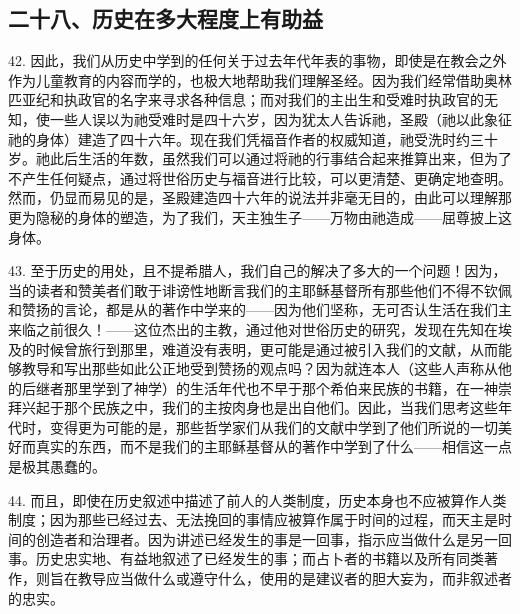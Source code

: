 
\subsection{二十八、历史在多大程度上有助益}

42. 因此，我们从历史中学到的任何关于过去年代年表的事物，即使是在教会之外作为儿童教育的内容而学的，也极大地帮助我们理解圣经。因为我们经常借助奥林匹亚纪和执政官的名字来寻求各种信息；而对我们的主出生和受难时执政官的无知，使一些人误以为祂受难时是四十六岁，因为犹太人告诉祂，圣殿（祂以此象征祂的身体）建造了四十六年。现在我们凭福音作者的权威知道，祂受洗时约三十岁。祂此后生活的年数，虽然我们可以通过将祂的行事结合起来推算出来，但为了不产生任何疑点，通过将世俗历史与福音进行比较，可以更清楚、更确定地查明。然而，仍显而易见的是，圣殿建造四十六年的说法并非毫无目的，由此可以理解那更为隐秘的身体的塑造，为了我们，天主独生子——万物由祂造成——屈尊披上这身体。\par

43. 至于历史的用处，且不提希腊人，我们自己的解决了多大的一个问题！因为，当的读者和赞美者们敢于诽谤性地断言我们的主耶稣基督所有那些他们不得不钦佩和赞扬的言论，都是从的著作中学来的——因为他们坚称，无可否认生活在我们主来临之前很久！——这位杰出的主教，通过他对世俗历史的研究，发现在先知在埃及的时候曾旅行到那里，难道没有表明，更可能是通过被引入我们的文献，从而能够教导和写出那些如此公正地受到赞扬的观点吗？因为就连本人（这些人声称从他的后继者那里学到了神学）的生活年代也不早于那个希伯来民族的书籍，在一神崇拜兴起于那个民族之中，我们的主按肉身也是出自他们。因此，当我们思考这些年代时，变得更为可能的是，那些哲学家们从我们的文献中学到了他们所说的一切美好而真实的东西，而不是我们的主耶稣基督从的著作中学到了什么——相信这一点是极其愚蠢的。\par

44. 而且，即使在历史叙述中描述了前人的人类制度，历史本身也不应被算作人类制度；因为那些已经过去、无法挽回的事情应被算作属于时间的过程，而天主是时间的创造者和治理者。因为讲述已经发生的事是一回事，指示应当做什么是另一回事。历史忠实地、有益地叙述了已经发生的事；而占卜者的书籍以及所有同类著作，则旨在教导应当做什么或遵守什么，使用的是建议者的胆大妄为，而非叙述者的忠实。\par


